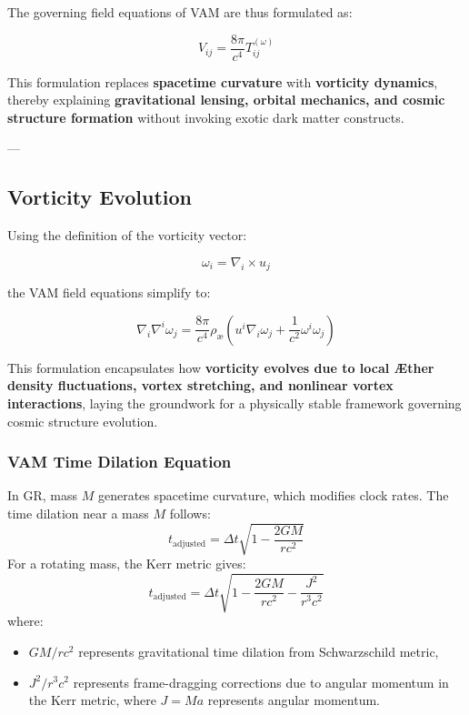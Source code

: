 The governing field equations of VAM are thus formulated as:

\begin{equation*}
    V_{ij} = \frac{8\pi}{c^4} T^{(\omega)}_{ij}
\end{equation*}


This formulation replaces \textbf{spacetime curvature} with \textbf{vorticity dynamics}, thereby explaining \textbf{gravitational lensing, orbital mechanics, and cosmic structure formation} without invoking exotic dark matter constructs.

---



\subsection{Vorticity Evolution}

Using the definition of the vorticity vector:

\begin{equation*}
    \omega_i = \nabla_i \times u_j
\end{equation*}

the VAM field equations simplify to:

\begin{equation*}
    \nabla_i \nabla^i \omega_j = \frac{8\pi}{c^4} \rho_\text{\ae} \left( u^i \nabla_i \omega_j + \frac{1}{c^2} \omega^i \omega_j \right)
\end{equation*}

This formulation encapsulates how \textbf{vorticity evolves due to local Æther density fluctuations, vortex stretching, and nonlinear vortex interactions}, laying the groundwork for a physically stable framework governing cosmic structure evolution.

\subsubsection*{VAM Time Dilation Equation}
In GR, mass $M$ generates spacetime curvature, which modifies clock rates. The time dilation near a mass $M$ follows:
\begin{equation*}
    t_\text{adjusted} = \Delta t \sqrt{1 - \frac{2GM}{rc^2}}
\end{equation*}
For a rotating mass, the Kerr metric gives:
\begin{equation*}
    t_\text{adjusted} = \Delta t \sqrt{1 - \frac{2GM}{r c^2} - \frac{J^2}{r^3 c^2}}
\end{equation*}
where:
\begin{itemize}
    \item $GM/r c^2$ represents gravitational time dilation from Schwarzschild metric,
    \item $J^2/r^3 c^2$ represents frame-dragging corrections due to angular momentum in the Kerr metric, where $J = M a$ represents angular momentum.
\end{itemize}

